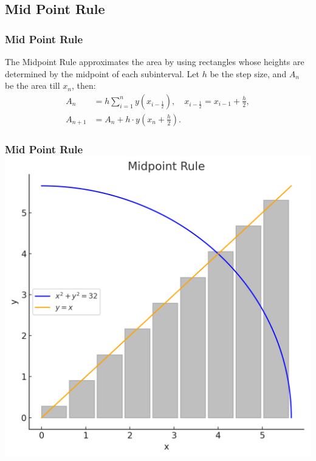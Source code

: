 \documentclass{beamer}
\theoremstyle{remark}
\numberwithin{equation}{section}
\begin{document}
\subsection{Mid Point Rule}
\begin{frame}
\frametitle{Mid Point Rule}
The Midpoint Rule approximates the area by using rectangles whose heights are determined by the midpoint of each subinterval. Let \(h\) be the step size, and \(A_n\) be the area till \(x_n\), then:
\begin{align}
    A_n &= h\sum_{i=1}^n y\left(x_{i - \frac{1}{2}}\right), \quad x_{i - \frac{1}{2}} = x_{i-1} + \frac{h}{2},\\
    A_{n + 1} &= A_n + h\cdot y\left(x_n + \frac{h}{2}\right).
\end{align}
\frametitle{\hspace{0.5em} Mid Point Rule \hfill \includegraphics[scale=0.1]{figs/3.png}}

\end{frame}
\end{document}
